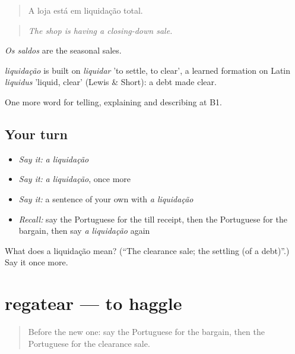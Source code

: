 \begin{quote}
A loja está em liquidação total.
\end{quote}

\begin{quote}
\emph{The shop is having a closing-down sale.}
\end{quote}

\emph{Os saldos} are the seasonal sales.

\begin{cousinweb}
\emph{liquidação} is built on \emph{liquidar} 'to settle, to clear', a learned formation on Latin \emph{liquidus} 'liquid, clear' (Lewis \& Short): a debt made clear.
\end{cousinweb}

\begin{grammarlens}[title={What you've built}]
One more word for telling, explaining and describing at B1.
\end{grammarlens}

\subsection*{Your turn}
\begin{itemize}
\raggedright
  \item \emph{Say it:} \emph{a liquidação}
  \item \emph{Say it:} \emph{a liquidação}, once more
  \item \emph{Say it:} a sentence of your own with \emph{a liquidação}
  \item \emph{Recall:} say the Portuguese for the till receipt, then the Portuguese for the bargain, then say \emph{a liquidação} again
\end{itemize}

\begin{tcolorbox}[breakable,colback=teal!4,colframe=teal!35!black,title={Before you move on}]
What does a liquidação mean? (\textquotedblleft{}The clearance sale; the settling (of a debt)\textquotedblright{}.) Say it once more.
\end{tcolorbox}
\section[regatear]{regatear — to haggle}

\label{lesson:PT-C453-regatear}



\begin{quote}
Before the new one: say the Portuguese for the bargain, then the Portuguese for the clearance sale.
\end{quote}

